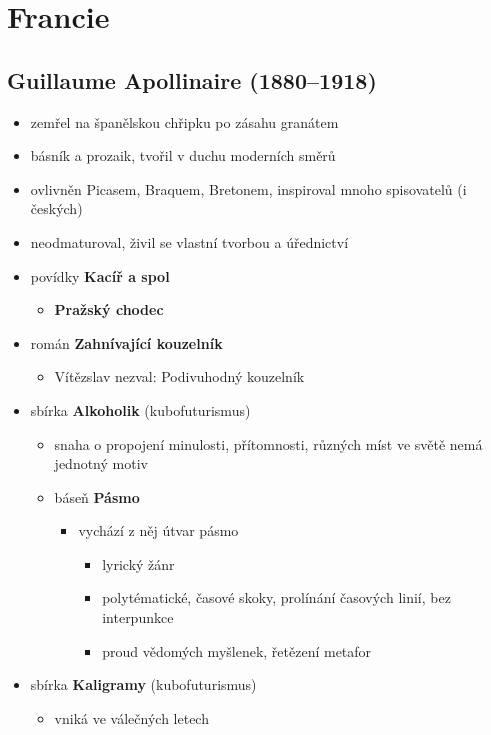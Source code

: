 \section{Francie}
\subsection{Guillaume Apollinaire (1880--1918)}
\begin{itemize}
\item zemřel na španělskou chřipku po zásahu granátem
\item básník a prozaik, tvořil v duchu moderních směrů
\item ovlivněn Picasem, Braquem, Bretonem, inspiroval mnoho spisovatelů (i českých)
\item neodmaturoval, živil se vlastní tvorbou a úřednictví
\item povídky \textbf{Kacíř a spol}
	\begin{itemize}
	\item \textbf{Pražský chodec}
	\end{itemize}
\item román \textbf{Zahnívající kouzelník}
	\begin{itemize}
	\item[\ra] Vítězslav nezval: Podivuhodný kouzelník 
	\end{itemize}
\item sbírka \textbf{Alkoholik} (kubofuturismus)
	\begin{itemize}
	\item snaha o propojení minulosti, přítomnosti, různých míst ve světě \ra nemá jednotný motiv
	\item báseň \textbf{Pásmo}
		\begin{itemize}
		\item vychází z něj útvar pásmo
			\begin{itemize}
			\item lyrický žánr
			\item polytématické, časové skoky, prolínání časových linií, bez interpunkce
			\item proud vědomých myšlenek, řetězení metafor
			\end{itemize}
		\end{itemize}
	\end{itemize}
\item sbírka \textbf{Kaligramy} (kubofuturismus)
	\begin{itemize}
	\item vniká ve válečných letech

\end{itemize}
\end{itemize}

